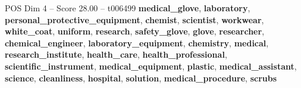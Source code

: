 \begin{textsample}{POS Dim 4 – Score 28.00 – t006499}  \label{ex:f4_pos_036}
\textbf{medical\_glove}, \textbf{laboratory}, \textbf{personal\_protective\_equipment}, \textbf{chemist}, \textbf{scientist}, \textbf{workwear}, \textbf{white\_coat}, \textbf{uniform}, \textbf{research}, \textbf{safety\_glove}, \textbf{glove}, \textbf{researcher}, \textbf{chemical\_engineer}, \textbf{laboratory\_equipment}, \textbf{chemistry}, \textbf{medical}, \textbf{research\_institute}, \textbf{health\_care}, \textbf{health\_professional}, \textbf{scientific\_instrument}, \textbf{medical\_equipment}, \textbf{plastic}, \textbf{medical\_assistant}, \textbf{science}, \textbf{cleanliness}, \textbf{hospital}, \textbf{solution}, \textbf{medical\_procedure}, \textbf{scrubs}

\end{textsample}
